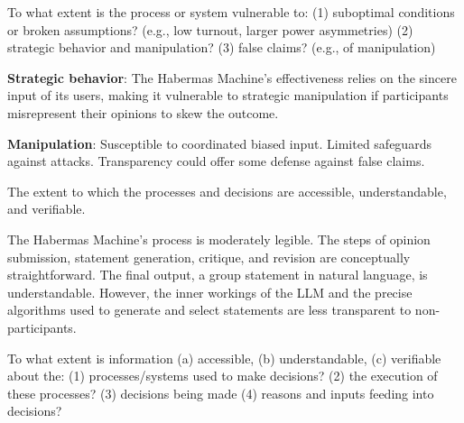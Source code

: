     \begin{evaluate}[grey]
        To what extent is the process or system vulnerable to: (1) suboptimal conditions or broken assumptions? (e.g., low turnout, larger power asymmetries) (2) strategic behavior and manipulation? (3) false claims? (e.g., of manipulation)
    \end{evaluate}

    \begin{noitemize}
        \item \textbf{Strategic behavior}: The Habermas Machine's effectiveness relies on the sincere input of its users, making it vulnerable to strategic manipulation if participants misrepresent their opinions to skew the outcome. 
        \item \textbf{Manipulation}: Susceptible to coordinated biased input. Limited safeguards against attacks. Transparency could offer some defense against false claims.
    \end{noitemize}
    
    
    \begin{describe}[grey]
        The extent to which the processes and decisions are accessible, understandable, and verifiable.
    \end{describe}

    The Habermas Machine's process is moderately legible. The steps of opinion submission, statement generation, critique, and revision are conceptually straightforward. The final output, a group statement in natural language, is understandable. However, the inner workings of the LLM and the precise algorithms used to generate and select statements are less transparent to non-participants.
    
    \begin{evaluate}[grey]
        To what extent is information (a) accessible, (b) understandable, (c) verifiable about the: (1) processes/systems used to make decisions? (2) the execution of these processes? (3) decisions being made (4) reasons and inputs feeding into decisions?
    \end{evaluate}

